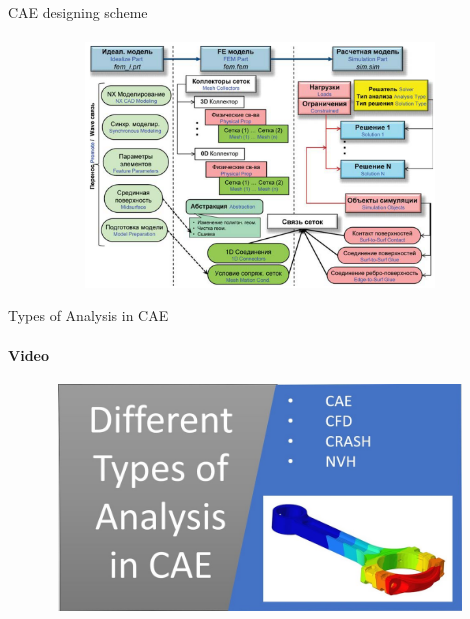 \documentclass[aspectratio=169]{beamer}
\begin{document}
\begin{frame}[t]{CAE designing scheme}
\framesubtitle{}
    \vspace{-0.6cm}
    \begin{figure}[H]
        \centering\includegraphics[height=6.5cm,width=1\textwidth,keepaspectratio]{cae_overview.png}
        \label{fig:cae_overview.png}
    \end{figure}
\end{frame}

\begin{frame}[t]{Types of Analysis in CAE}
    \framesubtitle{Video}
    \vspace{-0.6cm}
    \begin{figure}[H]
        \href{https://youtu.be/LyIHUFzO9kE}{
            \centering\includegraphics[height=6cm,width=1\textwidth,keepaspectratio]{types_of_analysis_in_cae_video.jpg}}
        \label{fig:types_of_analysis_in_cae_video.jpg}
    \end{figure}
\end{frame}
\end{document}
